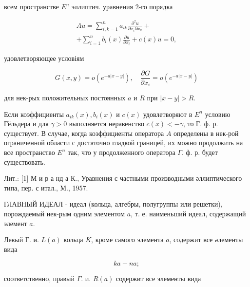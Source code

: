 \documentclass[10pt]{article}
\begin{document}
всем пространстве $E^{n}$ эллиптич. уравнения 2-го порядка



\[

\begin{gathered}

A u=\sum_{i, k=1}^{n} a_{i k} \frac{\partial^{2} u}{\partial x_{i} \partial x_{k}}+ \\

+\sum_{i=1}^{n} b_{i}(x) \frac{\partial u}{\partial x_{i}}+c(x) u=0,

\end{gathered}

\]



удовлетворяющее условіям



\[

G(x, y)=o\left(e^{-a|x-y|}\right), \quad \frac{\partial G}{\partial x_{i}}=o\left(e^{-a|x-y|}\right)

\]



для нек-рых положительных постоянных $a$ и $R$ при $|x-y|>R$.



Если коэффициенты $a_{i k}(x), b_{i}(x)$ и $c(x)$ удовлетворяют в $E^{n}$ условию Гёльдера и для $\gamma>0$ выполняется неравенство $c(x)<-\gamma$, то Г. ф. р. существует. В случае, когда коэффициенты оператора $A$ определены в нек-рой ограниченной области с достаточно гладкой границей, их можно продолжить на все пространство $E^{n}$ так, что у продолженного оператора $\Gamma$. ф. р. будет существовать.



Лит.: [1] М и р а нд а К., Уравнения с частными производными әллиптического типа, пер. с итал., М., 1957.



ГЛАВНЫЙ ИДЕАЛ - идеал (кольца, алгебры, полугруппы или решетки), порождаемый нек-рым одним элементом $a$, т. е. наименьший идеал, содержащий элемент $a$.



Левый Г. и. $L(a)$ кольца $K$, кроме самого элемента $a$, содержит все әлементы вида



\[

k a+n a ;

\]



соответственно, правый $\Gamma$. и. $R(a)$ содержит все элементы вида
\end{document}
